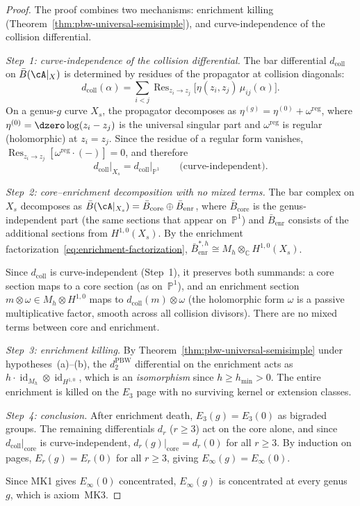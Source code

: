 \begin{proof}
The proof combines two mechanisms: enrichment killing
(Theorem~\ref{thm:pbw-universal-semisimple}),
and curve-independence of the collision differential.

\smallskip
\emph{Step~1: curve-independence of the collision
differential.}
The bar differential $d_{\mathrm{coll}}$ on
$\bar{B}(\cA|_X)$ is determined by residues of the
propagator at collision diagonals:
\[
d_{\mathrm{coll}}(\alpha)
= \sum_{i<j}
\operatorname{Res}_{z_i \to z_j}
\bigl[\eta(z_i, z_j)\, \mu_{ij}(\alpha)\bigr].
\]
On a genus-$g$ curve $X_s$, the propagator decomposes as
$\eta^{(g)} = \eta^{(0)} + \omega^{\mathrm{reg}}$, where
$\eta^{(0)} = \dzero\log(z_i - z_j)$ is the universal
singular part and $\omega^{\mathrm{reg}}$ is regular
(holomorphic) at $z_i = z_j$.  Since the residue of a
regular form vanishes,
$\operatorname{Res}_{z_i \to z_j}[\omega^{\mathrm{reg}}
\cdot (-)] = 0$, and therefore
\[
d_{\mathrm{coll}}\big|_{X_s}
= d_{\mathrm{coll}}\big|_{\mathbb{P}^1}
\qquad
\text{(curve-independent).}
\]

\smallskip
\emph{Step~2: core--enrichment decomposition with no
mixed terms.}
The bar complex on $X_s$ decomposes as
$\bar{B}(\cA|_{X_s}) =
\bar{B}_{\mathrm{core}} \oplus
\bar{B}_{\mathrm{enr}}$,
where $\bar{B}_{\mathrm{core}}$ is the genus-independent
part (the same sections that appear on~$\mathbb{P}^1$) and
$\bar{B}_{\mathrm{enr}}$ consists of the additional
sections from $H^{1,0}(X_s)$.  By the enrichment
factorization~\eqref{eq:enrichment-factorization},
$\bar{B}_{\mathrm{enr}}^{*,h}
\cong M_h \otimes_{\mathbb{C}} H^{1,0}(X_s)$.

Since $d_{\mathrm{coll}}$ is curve-independent (Step~1),
it preserves both summands:
a core section maps to a core section (as on~$\mathbb{P}^1$),
and an enrichment section
$m \otimes \omega \in M_h \otimes H^{1,0}$
maps to $d_{\mathrm{coll}}(m) \otimes \omega$
(the holomorphic form $\omega$ is a passive
multiplicative factor, smooth across all collision
divisors).  There are no mixed terms between core and
enrichment.

\smallskip
\emph{Step~3: enrichment killing.}
By Theorem~\ref{thm:pbw-universal-semisimple}
under hypotheses~(a)--(b), the $d_2^{\mathrm{PBW}}$
differential on the enrichment acts as
$h \cdot \operatorname{id}_{M_h}
\otimes \operatorname{id}_{H^{1,0}}$,
which is an \emph{isomorphism} since
$h \geq h_{\min} > 0$.  The entire enrichment is
killed on the $E_3$ page with no surviving kernel or
extension classes.

\smallskip
\emph{Step~4: conclusion.}
After enrichment death, $E_3(g) = E_3(0)$ as bigraded
groups.  The remaining differentials $d_r$ ($r \geq 3$)
act on the core alone, and since
$d_{\mathrm{coll}}\big|_{\mathrm{core}}$ is
curve-independent, $d_r(g)\big|_{\mathrm{core}} = d_r(0)$
for all $r \geq 3$.  By induction on pages,
$E_r(g) = E_r(0)$ for all $r \geq 3$, giving
$E_\infty(g) = E_\infty(0)$.

Since MK1 gives $E_\infty(0)$ concentrated, $E_\infty(g)$
is concentrated at every genus~$g$, which is axiom~MK3.
\end{proof}

